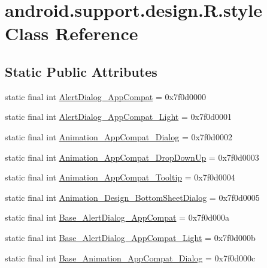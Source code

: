 \hypertarget{classandroid_1_1support_1_1design_1_1R_1_1style}{}\section{android.\+support.\+design.\+R.\+style Class Reference}
\label{classandroid_1_1support_1_1design_1_1R_1_1style}
\subsection*{Static Public Attributes}
\begin{DoxyCompactItemize}
\item 
static final int \mbox{\hyperlink{classandroid_1_1support_1_1design_1_1R_1_1style_a18ec447211099976a5704ae5d237795a}{Alert\+Dialog\+\_\+\+App\+Compat}} = 0x7f0d0000
\item 
static final int \mbox{\hyperlink{classandroid_1_1support_1_1design_1_1R_1_1style_a5fc28cfb8b777b79c8190cd259a037c1}{Alert\+Dialog\+\_\+\+App\+Compat\+\_\+\+Light}} = 0x7f0d0001
\item 
static final int \mbox{\hyperlink{classandroid_1_1support_1_1design_1_1R_1_1style_afc859831d6bcff267de3ceda0de4d65d}{Animation\+\_\+\+App\+Compat\+\_\+\+Dialog}} = 0x7f0d0002
\item 
static final int \mbox{\hyperlink{classandroid_1_1support_1_1design_1_1R_1_1style_ae65c69c112be812a18d7f16d15c8a099}{Animation\+\_\+\+App\+Compat\+\_\+\+Drop\+Down\+Up}} = 0x7f0d0003
\item 
static final int \mbox{\hyperlink{classandroid_1_1support_1_1design_1_1R_1_1style_a7ef015e5a7675bd78e360a7be18a41e1}{Animation\+\_\+\+App\+Compat\+\_\+\+Tooltip}} = 0x7f0d0004
\item 
static final int \mbox{\hyperlink{classandroid_1_1support_1_1design_1_1R_1_1style_ab2b82a0c45a4a4e33b8d7151fcb26db5}{Animation\+\_\+\+Design\+\_\+\+Bottom\+Sheet\+Dialog}} = 0x7f0d0005
\item 
static final int \mbox{\hyperlink{classandroid_1_1support_1_1design_1_1R_1_1style_a3478a35666043a8e87309030935f5a60}{Base\+\_\+\+Alert\+Dialog\+\_\+\+App\+Compat}} = 0x7f0d000a
\item 
static final int \mbox{\hyperlink{classandroid_1_1support_1_1design_1_1R_1_1style_ae0afd65daccda54e3d8a57251bbf0c38}{Base\+\_\+\+Alert\+Dialog\+\_\+\+App\+Compat\+\_\+\+Light}} = 0x7f0d000b
\item 
static final int \mbox{\hyperlink{classandroid_1_1support_1_1design_1_1R_1_1style_a92600d437c660a5b33479eca5df7375c}{Base\+\_\+\+Animation\+\_\+\+App\+Compat\+\_\+\+Dialog}} = 0x7f0d000c

\end{DoxyCompactItemize}
